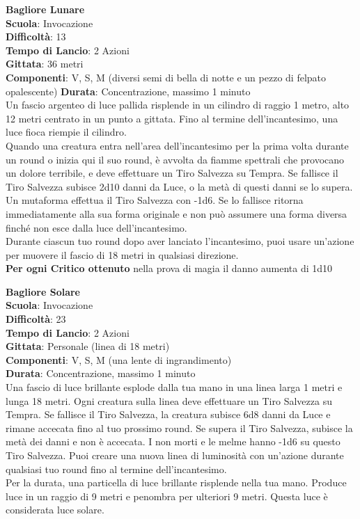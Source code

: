 \begin{multicols}{2}
\medskip\textbf{Bagliore Lunare}\\
\textbf{Scuola}: Invocazione\\
\textbf{Difficoltà}:  13\\
\textbf{Tempo di Lancio}: 2 Azioni\\
\textbf{Gittata}: 36 metri\\
\textbf{Componenti}: V, S, M (diversi semi di bella di notte e un pezzo di felpato opalescente)
\textbf{Durata}: Concentrazione, massimo 1 minuto\\
Un fascio argenteo di luce pallida risplende in un cilindro di raggio 1 metro, alto 12 metri centrato in un punto a gittata. Fino al termine dell'incantesimo, una luce fioca riempie il cilindro. \\
Quando una creatura entra nell'area dell'incantesimo per la prima volta durante un round o inizia qui il suo round, è avvolta da fiamme spettrali che provocano un dolore terribile, e deve effettuare un Tiro Salvezza su Tempra. Se fallisce il Tiro Salvezza subisce 2d10 danni da Luce, o la metà di questi danni se lo supera. Un mutaforma effettua il Tiro Salvezza con -1d6. Se lo fallisce ritorna immediatamente alla sua forma originale e non può assumere una forma diversa finché non esce dalla luce dell'incantesimo.\\
Durante ciascun tuo round dopo  aver lanciato l'incantesimo, puoi usare un'azione per muovere il
fascio di 18 metri in qualsiasi direzione. \\
\textbf{Per ogni Critico ottenuto} nella prova di magia il danno aumenta di 1d10


\medskip\textbf{Bagliore Solare}\\
\textbf{Scuola}: Invocazione\\
\textbf{Difficoltà}:  23\\
\textbf{Tempo di Lancio}: 2 Azioni\\
\textbf{Gittata}: Personale (linea di 18 metri)\\
\textbf{Componenti}: V, S, M (una lente di ingrandimento)\\
\textbf{Durata}: Concentrazione, massimo 1 minuto\\
Una fascio di luce brillante esplode dalla tua mano in una linea larga 1 metri e lunga 18 metri. Ogni creatura sulla linea deve effettuare un Tiro Salvezza su Tempra. Se fallisce il Tiro Salvezza, la creatura subisce 6d8 danni da Luce e rimane accecata fino al tuo prossimo round. Se supera il Tiro Salvezza, subisce la metà dei danni e non è accecata. I non morti e le melme hanno -1d6 su questo Tiro Salvezza. Puoi creare una nuova linea di luminosità con un'azione durante qualsiasi tuo round fino al termine dell'incantesimo.\\
Per la durata, una particella di luce brillante risplende nella tua mano. Produce luce in un raggio di 9 metri e penombra per ulteriori 9 metri. Questa luce è considerata luce solare.


\end{multicols}
